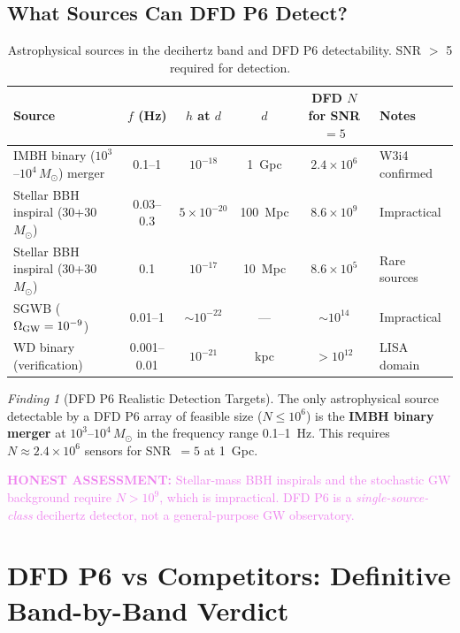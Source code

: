 \documentclass[11pt]{article}
\theoremstyle{definition}
\theoremstyle{remark}
\newtheorem{finding}[theorem]{Finding}
\newcommand{\ee}[1]{\times10^{#1}}
\newcommand{\Msun}{M_\odot}
\newcommand{\honest}[1]{\textcolor{violet}{\textbf{HONEST ASSESSMENT:} #1}}
\begin{document}
\subsection{What Sources Can DFD P6 Detect?}

\begin{table}[H]
\centering
\caption{Astrophysical sources in the decihertz band and DFD P6 detectability.
SNR $>$ 5 required for detection.}
\label{tab:P6-sources}
\begin{tabular}{@{}p{3.5cm}ccccl@{}}
\toprule
Source & $f$ (Hz) & $h$ at $d$ & $d$ & DFD $N$ for SNR $= 5$
  & Notes \\
\midrule
IMBH binary ($10^3$--$10^4\,\Msun$) merger
  & 0.1--1 & $10^{-18}$ & 1~Gpc
  & $2.4\ee{6}$ & W3i4 confirmed \\[3pt]
Stellar BBH inspiral (30+30~$\Msun$)
  & 0.03--0.3 & $5\ee{-20}$ & 100~Mpc
  & $8.6\ee{9}$ & Impractical \\[3pt]
Stellar BBH inspiral (30+30~$\Msun$)
  & 0.1 & $10^{-17}$ & 10~Mpc
  & $8.6\ee{5}$ & Rare sources \\[3pt]
SGWB ($\Omega_{\rm GW} = 10^{-9}$)
  & 0.01--1 & $\sim 10^{-22}$ & ---
  & $\sim 10^{14}$ & Impractical \\[3pt]
WD binary (verification)
  & 0.001--0.01 & $10^{-21}$ & kpc
  & $>10^{12}$ & LISA domain \\
\bottomrule
\end{tabular}
\end{table}

\begin{finding}[DFD P6 Realistic Detection Targets]
\label{find:P6-targets}
The only astrophysical source detectable by a DFD P6 array of feasible
size ($N \leq 10^6$) is the \textbf{IMBH binary merger} at
$10^3$--$10^4\,\Msun$ in the frequency range 0.1--1~Hz. This requires
$N \approx 2.4\ee{6}$ sensors for SNR~$= 5$ at 1~Gpc.

\honest{Stellar-mass BBH inspirals and the stochastic GW background
require $N > 10^9$, which is impractical. DFD P6 is a
\emph{single-source-class} decihertz detector, not a general-purpose
GW observatory.}
\end{finding}

\section{DFD P6 vs Competitors: Definitive Band-by-Band Verdict}
\label{sec:P6-verdict}
\end{document}
